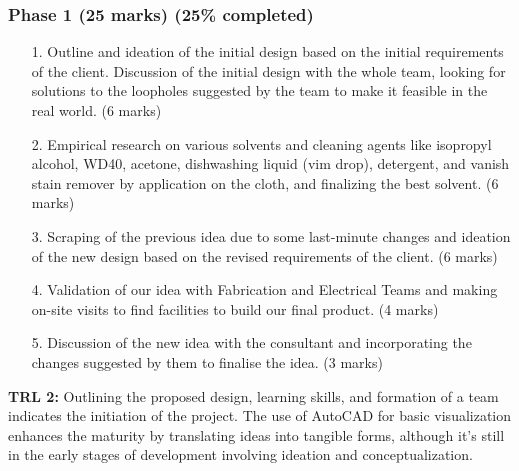 \documentclass[table,french,english]{rapportCS}
\begin{document}
\subsubsection*{Phase 1 (25 marks) (25\% completed)}
\begin{enumerate}
    \item[1.] Outline and ideation of the initial design based on the initial requirements of the client. Discussion of the initial design with the whole team, looking for solutions to the loopholes suggested by the team to make it feasible in the real world. (6 marks)

    \item[2.] Empirical research on various solvents and cleaning agents like isopropyl alcohol, WD40, acetone, dishwashing liquid (vim drop), detergent, and vanish stain remover by application on the cloth, and finalizing the best solvent. (6 marks)

    \item[3.] Scraping of the previous idea due to some last-minute changes and ideation of the new design based on the revised requirements of the client. (6 marks)

    \item[4.] Validation of our idea with Fabrication and Electrical Teams and making on-site visits to find facilities to build our final product. (4 marks)

    \item[5.] Discussion of the new idea with the consultant and incorporating the changes suggested by them to finalise the idea. (3 marks)
    
\end{enumerate}
\textbf{TRL 2:} Outlining the proposed design, learning skills, and formation of a team indicates the initiation of the project. The use of AutoCAD for basic visualization enhances the maturity by translating ideas into tangible forms, although it's still in the early stages of development involving ideation and conceptualization.

\vspace{0.5cm}
\end{document}
